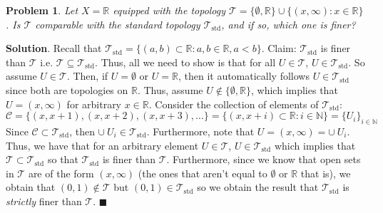 \documentclass[12pt]{article}
\renewcommand{\=}[1]{\stackrel{#1}{=}} %
\providecommand{\RR}{\mathbb{R}}
\providecommand{\NN}{\mathbb{N}}
\providecommand{\T}{\mathcal{T}}
\newtheorem{p}{Problem}[section]
\theoremstyle{definition}
\newenvironment{s}{%
        \begin{trivlist} \item \textbf{Solution}. }{%
            \hspace*{\fill} $\blacksquare$\end{trivlist}}%
\begin{document}
\newpage

\begin{p}
    Let $X = \mathbb{R}$ equipped with the topology $\T = \{\emptyset, \RR\} \cup \{(x,\infty):x\in\RR\}$. Is $\T$ comparable
    with the standard topology $\T_{\text{std}}$, and if so, which one is finer?
\end{p}
\begin{s}
    Recall that $\T_{\text{std}} = \{(a,b)\subset\RR: a,b\in\RR, a<b\}$. Claim: $\T_{\text{std}}$ is finer than $\T$ i.e. 
    $\T \subseteq \T_{\text{std}}$. Thus, all we need to show is that for all $U\in\T$, $U\in\T_{\text{std}}$. So assume
    $U\in\T$. Then, if $U = \emptyset$ or $U = \RR$, then it automatically follows $U\in\T_{\text{std}}$ since both are
    topologies on $\RR$. Thus, assume $U\not\in\{\emptyset,\RR\}$, which implies that $U = (x,\infty)$ for arbitrary $x\in\RR$.
    Consider the collection of elements of $\T_{\text{std}}$:
    \[ \mathcal{C} = \{(x,x+1),(x,x+2),(x,x+3),\hdots\} = \{(x,x+i)\subset\RR: i\in\NN\} = \{U_i\}_{i\in\NN}\]
    Since $\mathcal{C}\subset\T_{\text{std}}$, then $\cup\:U_i \in \T_{\text{std}}$. Furthermore, note that
    $U = (x,\infty) = \cup\:U_i$. Thus, we have that for an arbitrary element $U\in\T$, $U\in\T_{\text{std}}$ which
    implies that $\T\subset\T_{\text{std}}$ so that $\T_{\text{std}}$ is finer than $\T$. Furthermore, since we know
    that open sets in $\T$ are of the form $(x,\infty)$ (the ones that aren't equal to $\emptyset$ or $\RR$ that is),
    we obtain that $(0,1)\not\in\T$ but $(0,1)\in\T_{\text{std}}$ so we obtain the result that $\T_{\text{std}}$ is \textit{strictly} finer
    than $\T$.
\end{s}
\end{document}
